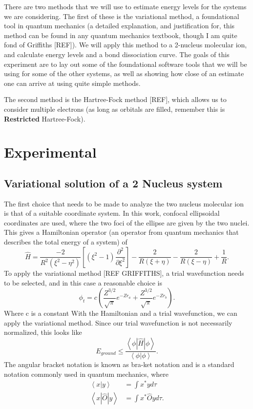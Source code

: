 \documentclass{achemso}
\begin{document}
There are two methods that we will use to estimate energy levels for the systems we are considering.  The first of these is the variational method, a foundational tool in quantum mechanics (a detailed explanation, and justification for, this method can be found in any quantum mechanics textbook, though I am quite fond of Griffiths [REF]).  We will apply this method to a 2-nucleus  molecular ion, and calculate energy levels and a bond dissociation curve.  The goals of this experiment are to lay out some of the foundational software tools that we will be using for some of the other systems, as well as showing how close of an estimate one can arrive at using quite simple methods.

The second method is the Hartree-Fock method [REF], which allows us to consider multiple electrons (as long as orbitals are filled, remember this is \textbf{Restricted} Hartree-Fock).  

\section{Experimental}
\subsection{Variational solution of a 2 Nucleus system}
The first choice that needs to be made to analyze the two nucleus  molecular ion is that of a suitable coordinate system.  In this work, confocal ellipsoidal coordinates are used, where the two foci of the ellipse are given by the two nuclei.  This gives a Hamiltonian operator (an operator from quantum mechanics that describes the total energy of a system) of
\begin{equation}
	\hat{H} = \frac{-2}{R^2\left(\xi^2-\eta^2\right)}\left[\left(\xi^2-1\right)\frac{\partial^2 }{\partial\xi^2}\right]-\frac{2}{R(\xi+\eta)}-\frac{2}{R(\xi-\eta)}+\frac{1}{R}.
\end{equation}
To apply the variational method [REF GRIFFITHS], a trial wavefunction needs to be selected, and in this case a reasonable choice is
\begin{equation}
	\phi_t = c\left(\frac{Z^{3/2}}{\sqrt{\pi}}e^{-Zr_a} + \frac{Z^{3/2}}{\sqrt{\pi}}e^{-Zr_b}\right).
\end{equation}
Where c is a constant
With the Hamiltonian and a trial wavefunction, we can apply the variational method.  Since our trial wavefunction is not necessarily normalized, this looks like
\begin{equation}
E_{ground} \leq \frac{\left<\phi | \hat{H} | \phi \right>}{\left<\phi|\phi\right>}.
\end{equation} 
The angular bracket notation is known as bra-ket notation and is a standard notation commonly used in quantum mechanics, where
\begin{align}
	\left<x|y\right> &= \int x^* y d\tau \\
	\left<x|\hat{O}|y\right> &= \int x^* \hat{O}yd\tau.
\end{align}
\end{document}
